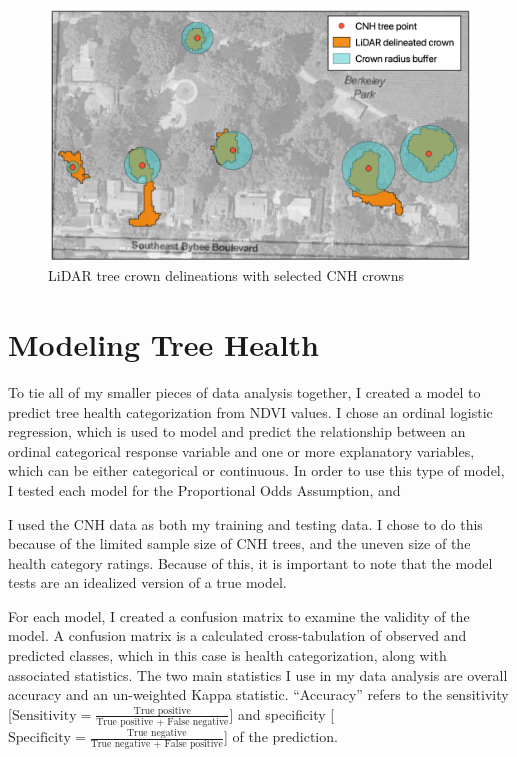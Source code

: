 \documentclass[12pt,twoside]{reedthesis}
\begin{document}
\begin{figure}

{\centering \includegraphics[width=0.8\linewidth]{figure/layered_outputs} 

}

\caption{LiDAR tree crown delineations with selected CNH crowns}\label{fig:unnamed-chunk-6}
\end{figure}
\hypertarget{modeling-tree-health}{%
\section{Modeling Tree Health}\label{modeling-tree-health}}

To tie all of my smaller pieces of data analysis together, I created a model to predict tree health categorization from NDVI values. I chose an ordinal logistic regression, which is used to model and predict the relationship between an ordinal categorical response variable and one or more explanatory variables, which can be either categorical or continuous. In order to use this type of model, I tested each model for the Proportional Odds Assumption, and

I used the CNH data as both my training and testing data. I chose to do this because of the limited sample size of CNH trees, and the uneven size of the health category ratings. Because of this, it is important to note that the model tests are an idealized version of a true model.

For each model, I created a confusion matrix to examine the validity of the model. A confusion matrix is a calculated cross-tabulation of observed and predicted classes, which in this case is health categorization, along with associated statistics. The two main statistics I use in my data analysis are overall accuracy and an un-weighted Kappa statistic. ``Accuracy'' refers to the sensitivity {[}\(\textrm{Sensitivity}= \frac{\textrm{True positive}}{\textrm{True positive + False negative}}\){]} and specificity {[}\(\textrm{Specificity}= \frac{\textrm{True negative}}{\textrm{True negative + False positive}}\){]} of the prediction.
\end{document}
